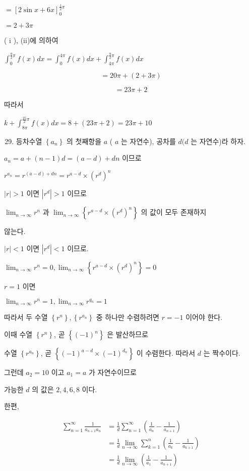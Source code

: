 \documentclass[10pt]{article}
\begin{document}
\(=[2 \sin x+6 x]_{0}^{\frac{1}{2} \pi}\)

\(=2+3 \pi\)

( i ), (ii)에 의하여

\(\int_{0}^{\frac{9}{2} \pi} f(x) d x=\int_{0}^{4 \pi} f(x) d x+\int_{4 \pi}^{\frac{9}{2} \pi} f(x) d x\)

\[
=20 \pi+(2+3 \pi)
\]

\[
=23 \pi+2
\]

따라서

\(k+\int_{8 \pi}^{\frac{25}{2} \pi} f(x) d x=8+(23 \pi+2)=23 \pi+10\)

\begin{enumerate}
  \setcounter{enumi}{28}
  \item 등차수열 \(\left\{a_{n}\right\}\) 의 첫째항을 \(a\) ( \(a\) 는 자연수), 공차를 \(d(d\) 는 자연수)라 하자.
\end{enumerate}

\(a_{n}=a+(n-1) d=(a-d)+d n\) 이므로

\(r^{a_{n}}=r^{(a-d)+d n}=r^{a-d} \times\left(r^{d}\right)^{n}\)

\(|r|>1\) 이면 \(\left|r^{d}\right|>1\) 이므로

\(\lim _{n \rightarrow \infty} r^{n}\) 과 \(\lim _{n \rightarrow \infty}\left\{r^{a-d} \times\left(r^{d}\right)^{n}\right\}\) 의 값이 모두 존재하지

않는다.

\(|r|<1\) 이면 \(\left|r^{d}\right|<1\) 이므로.

\(\lim _{n \rightarrow \infty} r^{n}=0, \lim _{n \rightarrow \infty}\left\{r^{a-d} \times\left(r^{d}\right)^{n}\right\}=0\)

\(r=1\) 이면

\(\lim _{n \rightarrow \infty} r^{n}=1, \lim _{n \rightarrow \infty} r^{q_{n}}=1\)

따라서 두 수열 \(\left\{r^{n}\right\},\left\{r^{a_{n}}\right\}\) 중 하나만 수렴하려면 \(r=-1\) 이어야 한다.

이때 수열 \(\left\{r^{n}\right\}\), 곧 \(\left\{(-1)^{n}\right\}\) 은 발산하므로

수열 \(\left\{r^{a_{n}}\right\}\), 곧 \(\left\{(-1)^{a-d} \times(-1)^{d_{n}}\right\}\) 이 수렴한다. 따라서 \(d\) 는 짝수이다.

그런데 \(a_{2}=10\) 이고 \(a_{1}=a\) 가 자연수이므로

가능한 \(d\) 의 값은 \(2,4,6,8\) 이다.

한편,

\[
\begin{aligned}
\sum_{n=1}^{\infty} \frac{1}{a_{n+1} a_{n}} & =\frac{1}{d} \sum_{n=1}^{\infty}\left(\frac{1}{a_{n}}-\frac{1}{a_{n+1}}\right) \\
& =\frac{1}{d} \lim _{n \rightarrow \infty} \sum_{k=1}^{n}\left(\frac{1}{a_{k}}-\frac{1}{a_{k+1}}\right) \\
& =\frac{1}{d} \lim _{n \rightarrow \infty}\left(\frac{1}{a_{1}}-\frac{1}{a_{n+1}}\right)
\end{aligned}
\]
\end{document}
